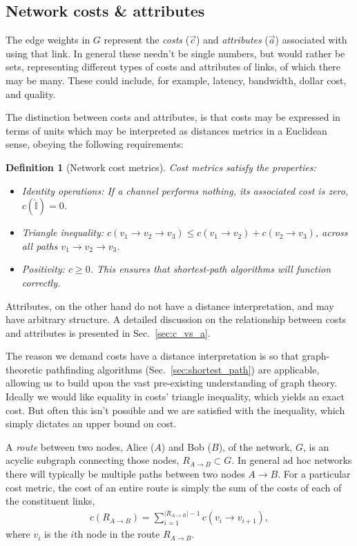 \documentclass[aps,rmp,twocolumn,amsmath,amssymb,nofootinbib,superscriptaddress]{revtex4}
\newtheorem{definition}{Definition}
\begin{document}
%
%

\subsection{Network costs \& attributes} \label{sec:costs}

The edge weights in $G$ represent the \emph{costs} ($\vec c$) and \emph{attributes} ($\vec a$) associated with using that link. In general these needn't be single numbers, but would rather be sets, representing different types of costs and attributes of links, of which there may be many. These could include, for example, latency, bandwidth, dollar cost, and quality.

The distinction between costs and attributes, is that costs may be expressed in terms of units which may be interpreted as distances metrics in a Euclidean sense, obeying the following requirements:

\begin{definition}[Network cost metrics] \label{def:metric} Cost metrics satisfy the properties:
\begin{itemize}
    \item Identity operations: If a channel performs nothing, its associated cost is zero, \mbox{$c(\mathbb{\hat{I}}) = 0$}.
    \item Triangle inequality: $c(v_1\to v_2\to v_3) \leq c(v_1\to v_2) + c(v_2\to v_3)$, across all paths \mbox{$v_1 \to v_2 \to v_3$}.
    \item Positivity: \mbox{$c\geq 0$}. This ensures that shortest-path algorithms will function correctly.
\end{itemize}
\end{definition}
Attributes, on the other hand do not have a distance interpretation, and may have arbitrary structure. A detailed discussion on the relationship between costs and attributes is presented in Sec.~\ref{sec:c_vs_a}.

The reason we demand costs have a distance interpretation is so that graph-theoretic pathfinding algorithms (Sec.~\ref{sec:shortest_path}) are applicable, allowing us to build upon the vast pre-existing understanding of graph theory. Ideally we would like equality in costs' triangle inequality, which yields an exact cost. But often this isn't possible and we are satisfied with the inequality, which simply dictates an upper bound on cost.

A \emph{route} between two nodes, Alice ($A$) and Bob ($B$), of the network, $G$, is an acyclic subgraph connecting those nodes, \mbox{$R_{A\to B}\subset G$}. In general ad hoc networks there will typically be multiple paths between two nodes \mbox{$A\to B$}. For a particular cost metric, the cost of an entire route is simply the sum of the costs of each of the constituent links,
\begin{align}
c(R_{A\to B}) = \sum_{i=1}^{|R_{A\to B}|-1} c(v_i \to v_{i+1}),
\end{align}
where $v_i$ is the $i$th node in the route $R_{A\to B}$.
\end{document}
